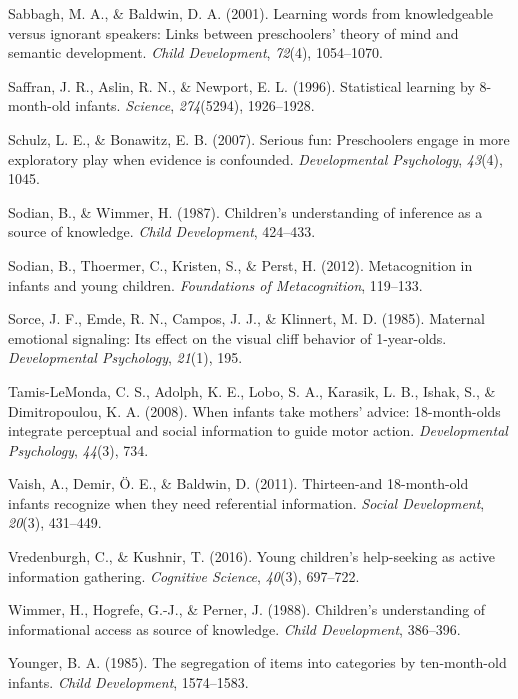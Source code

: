 \documentclass[floatsintext,man]{apa6}
\theoremstyle{definition}
\theoremstyle{definition}
\theoremstyle{definition}
\theoremstyle{remark}
\begin{document}
\hypertarget{ref-sabbagh2001learning}{}
Sabbagh, M. A., \& Baldwin, D. A. (2001). Learning words from
knowledgeable versus ignorant speakers: Links between preschoolers'
theory of mind and semantic development. \emph{Child Development},
\emph{72}(4), 1054--1070.

\hypertarget{ref-saffran1996statistical}{}
Saffran, J. R., Aslin, R. N., \& Newport, E. L. (1996). Statistical
learning by 8-month-old infants. \emph{Science}, \emph{274}(5294),
1926--1928.

\hypertarget{ref-schulz2007serious}{}
Schulz, L. E., \& Bonawitz, E. B. (2007). Serious fun: Preschoolers
engage in more exploratory play when evidence is confounded.
\emph{Developmental Psychology}, \emph{43}(4), 1045.

\hypertarget{ref-sodian1987children}{}
Sodian, B., \& Wimmer, H. (1987). Children's understanding of inference
as a source of knowledge. \emph{Child Development}, 424--433.

\hypertarget{ref-sodian2012metacognition}{}
Sodian, B., Thoermer, C., Kristen, S., \& Perst, H. (2012).
Metacognition in infants and young children. \emph{Foundations of
Metacognition}, 119--133.

\hypertarget{ref-sorce1985maternal}{}
Sorce, J. F., Emde, R. N., Campos, J. J., \& Klinnert, M. D. (1985).
Maternal emotional signaling: Its effect on the visual cliff behavior of
1-year-olds. \emph{Developmental Psychology}, \emph{21}(1), 195.

\hypertarget{ref-tamis2008infants}{}
Tamis-LeMonda, C. S., Adolph, K. E., Lobo, S. A., Karasik, L. B., Ishak,
S., \& Dimitropoulou, K. A. (2008). When infants take mothers' advice:
18-month-olds integrate perceptual and social information to guide motor
action. \emph{Developmental Psychology}, \emph{44}(3), 734.

\hypertarget{ref-vaish2011thirteen}{}
Vaish, A., Demir, Ö. E., \& Baldwin, D. (2011). Thirteen-and
18-month-old infants recognize when they need referential information.
\emph{Social Development}, \emph{20}(3), 431--449.

\hypertarget{ref-vredenburgh2016young}{}
Vredenburgh, C., \& Kushnir, T. (2016). Young children's help-seeking as
active information gathering. \emph{Cognitive Science}, \emph{40}(3),
697--722.

\hypertarget{ref-wimmer1988children}{}
Wimmer, H., Hogrefe, G.-J., \& Perner, J. (1988). Children's
understanding of informational access as source of knowledge.
\emph{Child Development}, 386--396.

\hypertarget{ref-younger1985segregation}{}
Younger, B. A. (1985). The segregation of items into categories by
ten-month-old infants. \emph{Child Development}, 1574--1583.
\end{document}
